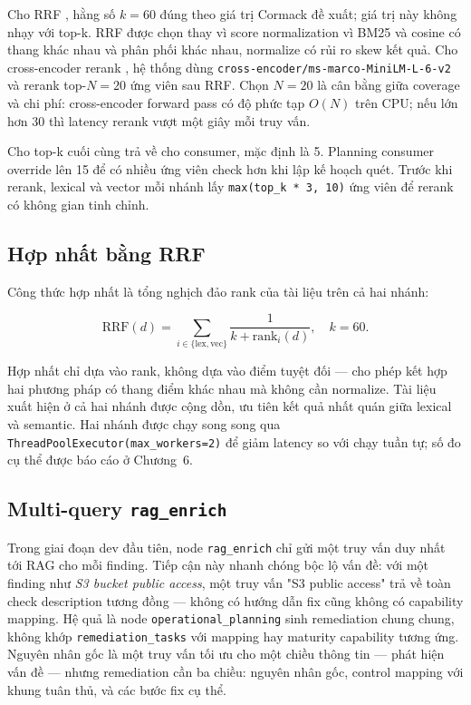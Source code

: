 Cho RRF \cite{cormack2009rrf}, hằng số $k = 60$ đúng theo giá trị Cormack đề xuất; giá trị này không nhạy với top-k. RRF được chọn thay vì score normalization vì BM25 và cosine có thang khác nhau và phân phối khác nhau, normalize có rủi ro skew kết quả. Cho cross-encoder rerank \cite{nogueira2019passage}, hệ thống dùng \texttt{cross-encoder/ms-marco-MiniLM-L-6-v2} và rerank top-$N=20$ ứng viên sau RRF. Chọn $N = 20$ là cân bằng giữa coverage và chi phí: cross-encoder forward pass có độ phức tạp $O(N)$ trên CPU; nếu lớn hơn 30 thì latency rerank vượt một giây mỗi truy vấn.

Cho top-k cuối cùng trả về cho consumer, mặc định là 5. Planning consumer override lên 15 để có nhiều ứng viên check hơn khi lập kế hoạch quét. Trước khi rerank, lexical và vector mỗi nhánh lấy \texttt{max(top\_k * 3, 10)} ứng viên để rerank có không gian tinh chỉnh.

\subsection{Hợp nhất bằng RRF}

Công thức hợp nhất là tổng nghịch đảo rank của tài liệu trên cả hai nhánh:

\begin{equation}
\text{RRF}(d) = \sum_{i \in \{\text{lex}, \text{vec}\}} \frac{1}{k + \text{rank}_i(d)}, \quad k = 60.
\end{equation}

Hợp nhất chỉ dựa vào rank, không dựa vào điểm tuyệt đối — cho phép kết hợp hai phương pháp có thang điểm khác nhau mà không cần normalize. Tài liệu xuất hiện ở cả hai nhánh được cộng dồn, ưu tiên kết quả nhất quán giữa lexical và semantic. Hai nhánh được chạy song song qua \texttt{ThreadPoolExecutor(max\_workers=2)} để giảm latency so với chạy tuần tự; số đo cụ thể được báo cáo ở Chương~6.

\subsection{Multi-query \texttt{rag\_enrich}}

Trong giai đoạn dev đầu tiên, node \texttt{rag\_enrich} chỉ gửi một truy vấn duy nhất tới RAG cho mỗi finding. Tiếp cận này nhanh chóng bộc lộ vấn đề: với một finding như \emph{S3 bucket public access}, một truy vấn "S3 public access" trả về toàn check description tương đồng — không có hướng dẫn fix cũng không có capability mapping. Hệ quả là node \texttt{operational\_planning} sinh remediation chung chung, không khớp \texttt{remediation\_tasks} với mapping hay maturity capability tương ứng. Nguyên nhân gốc là một truy vấn tối ưu cho một chiều thông tin — phát hiện vấn đề — nhưng remediation cần ba chiều: nguyên nhân gốc, control mapping với khung tuân thủ, và các bước fix cụ thể.

